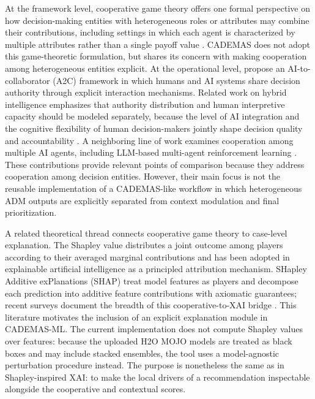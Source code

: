 \documentclass{interact}
\begin{document}
At the framework level, cooperative game theory offers one formal perspective on how decision-making entities with heterogeneous roles or attributes may combine their contributions, including settings in which each agent is characterized by multiple attributes rather than a single payoff value \citep{Borkotokey2019}. CADEMAS does not adopt this game-theoretic formulation, but shares its concern with making cooperation among heterogeneous entities explicit. At the operational level, \citet{Tariq2024a} propose an AI-to-collaborator (A2C) framework in which humans and AI systems share decision authority through explicit interaction mechanisms. Related work on hybrid intelligence emphasizes that authority distribution and human interpretive capacity should be modeled separately, because the level of AI integration and the cognitive flexibility of human decision-makers jointly shape decision quality and accountability \citep{Deliu2026}. A neighboring line of work examines cooperation among multiple AI agents, including LLM-based multi-agent reinforcement learning \citep{Sun2024}. These contributions provide relevant points of comparison because they address cooperation among decision entities. However, their main focus is not the reusable implementation of a CADEMAS-like workflow in which heterogeneous ADM outputs are explicitly separated from context modulation and final prioritization.

A related theoretical thread connects cooperative game theory to case-level explanation. The Shapley value distributes a joint outcome among players according to their averaged marginal contributions \citep{Borkotokey2019} and has been adopted in explainable artificial intelligence as a principled attribution mechanism. SHapley Additive exPlanations (SHAP) \citep{Lundberg2017} treat model features as players and decompose each prediction into additive feature contributions with axiomatic guarantees; recent surveys document the breadth of this cooperative-to-XAI bridge \citep{Li2024}. This literature motivates the inclusion of an explicit explanation module in CADEMAS-ML. The current implementation does not compute Shapley values over features: because the uploaded H2O MOJO models are treated as black boxes and may include stacked ensembles, the tool uses a model-agnostic perturbation procedure instead. The purpose is nonetheless the same as in Shapley-inspired XAI: to make the local drivers of a recommendation inspectable alongside the cooperative and contextual scores.
\end{document}
